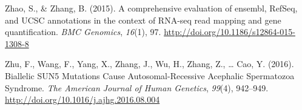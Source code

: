 \documentclass[12pt,twoside]{reedthesis}
\theoremstyle{definition}
\theoremstyle{definition}
\theoremstyle{remark}
\begin{document}
  \hypertarget{ref-Zhao2015}{}
  Zhao, S., \& Zhang, B. (2015). A comprehensive evaluation of ensembl,
  RefSeq, and UCSC annotations in the context of RNA-seq read mapping and
  gene quantification. \emph{BMC Genomics}, \emph{16}(1), 97.
  \url{http://doi.org/10.1186/s12864-015-1308-8}
  
  \hypertarget{ref-Zhu2016}{}
  Zhu, F., Wang, F., Yang, X., Zhang, J., Wu, H., Zhang, Z., \ldots{} Cao,
  Y. (2016). Biallelic SUN5 Mutations Cause Autosomal-Recessive Acephalic
  Spermatozoa Syndrome. \emph{The American Journal of Human Genetics},
  \emph{99}(4), 942--949. \url{http://doi.org/10.1016/j.ajhg.2016.08.004}


\end{document}
